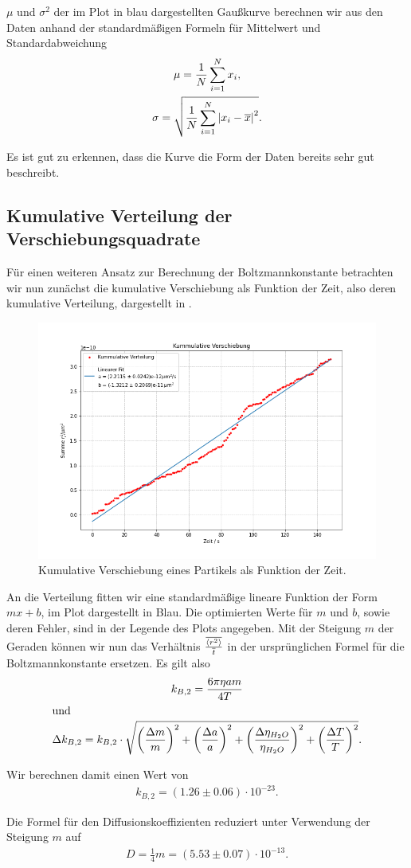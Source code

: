 $\mu$ und $\sigma^2$ der im Plot in blau dargestellten Gaußkurve berechnen wir aus den Daten anhand der standardmäßigen Formeln für Mittelwert und Standardabweichung
\begin{gather}
  \mu = \frac{1}{N} \sum_{i = 1}^N x_i,\\
  \sigma = \sqrt{\frac{1}{N} \sum_{i = 1}^N \qty|x_i - \overline{x}|^2}.
\end{gather}

Es ist gut zu erkennen, dass die Kurve die Form der Daten bereits sehr gut beschreibt.

\subsection{Kumulative Verteilung der Verschiebungsquadrate}

Für einen weiteren Ansatz zur Berechnung der Boltzmannkonstante betrachten wir nun zunächst die kumulative Verschiebung als Funktion der Zeit, also deren kumulative Verteilung, dargestellt in .

\begin{figure}[H]
  \centering
  \includegraphics[width=.90\textwidth]{files/brown3.png}
  \caption{Kumulative Verschiebung eines Partikels als Funktion der Zeit.}
  \label{fig:brown3}
\end{figure}

An die Verteilung fitten wir eine standardmäßige lineare Funktion der Form $mx + b$, im Plot dargestellt in Blau. Die optimierten Werte für $m$ und $b$, sowie deren Fehler, sind in der Legende des Plots angegeben. Mit der Steigung $m$ der Geraden können wir nun das Verhältnis $\frac{\overline{\expval{r^2}}}{\overline{t}}$ in der ursprünglichen Formel für die Boltzmannkonstante ersetzen. Es gilt also
\begin{gather}
  k_{B,2} = \frac{6\pi\eta a m}{4 T}\\
  \intertext{und}
  \Delta k_{B,2} = k_{B,2} \cdot \sqrt{\qty(\frac{\Delta m}{m})^{2} + \qty(\frac{\Delta a}{a})^{2} + \qty(\frac{\Delta \eta_{H_2 O}}{\eta_{H_2 O}})^{2} + \qty(\frac{\Delta T}{T})^{2}}.
\end{gather}

Wir berechnen damit einen Wert von
\begin{align}
  k_{B,2} = (1.26 \pm 0.06) \cdot 10^{-23}.
\end{align}

Die Formel für den Diffusionskoeffizienten reduziert unter Verwendung der Steigung $m$ auf
\begin{align}
  D = \frac{1}{4} m = (5.53 \pm 0.07) \cdot 10^{-13}.
\end{align}